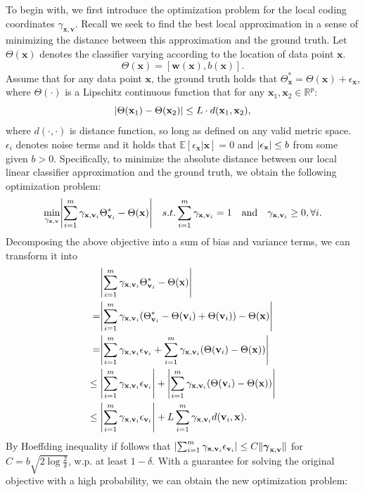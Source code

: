 \documentclass{llncs}
\DeclarePairedDelimiter\abs{\lvert}{\rvert}
\DeclarePairedDelimiter\norm{\lVert}{\rVert}
\def \x {\mathbf{x}}
\def \w {\mathbf{w}}
\def \v {\mathbf{v}}
\begin{document}
	To begin with, we first introduce the optimization problem for the local coding coordinates $\gamma_{\x,\v}$. Recall we seek to find the best local approximation in a sense of minimizing the distance between this approximation and the ground truth. Let $\Theta(\x)$ denotes the classifier varying according to the location of data point $\x$.
	\begin{equation}
	\Theta(\x) = [\w(\x), b(\x)].
	\end{equation}
	Assume that for any data point $\x$, the ground truth holds that $\Theta_{\x}^* = \Theta(\x) + \epsilon_{\x}$, where $\Theta(\cdot)$ is a Lipschitz continuous function that for any $\x_1, \x_2 \in \mathbb{R}^p$:
	\begin{equation}
	\abs{\Theta(\x_1)-\Theta(\x_2)} \leq L \cdot d(\x_1,\x_2),
	\end{equation}
	where $d(\cdot,\cdot)$ is distance function, so long as defined on any valid metric space. $\epsilon_i$ denotes noise terms and it holds that $\mathbb{E}[\epsilon_{\x}|\x]=0$ and $\abs{\epsilon_{\x}} \leq b$ from some given $b > 0$. Specifically, to minimize the absolute distance between our local linear classifier approximation and the ground truth, we obtain the following optimization problem:
	\begin{equation}
	\min_{\gamma_{\x,\v}} \abs*{\sum_{i=1}^m\gamma_{\x,\v_i}\Theta_{\v_i}^*- \Theta(\x)} \quad s.t. \sum_{i=1}^m\gamma_{\x,\v_i}=1 \quad \mbox{and} \quad \gamma_{\x,\v_i} \geq 0, \forall i.
	\end{equation} 
	Decomposing the above objective into a sum of bias and variance terms, we can transform it into
	\begin{equation}
	\begin{split}
	&\abs*{\sum_{i=1}^m\gamma_{\x,\v_i}\Theta_{\v_i}^*- \Theta(\x)} \\ {}=&\abs*{\sum_{i=1}^{m}\gamma_{\x,\v_i}(\Theta_{\v_i}^*-\Theta(\v_i)+\Theta(\v_i))-\Theta(\x)} \\
	{}=&\abs*{\sum_{i=1}^m\gamma_{\x,\v_i}\epsilon_{\v_i} + \sum_{i=1}^m\gamma_{\x,\v_i}(\Theta(\v_i)-\Theta(\x))}\\
	\leq{}& \abs*{\sum_{i=1}^m\gamma_{\x,\v_i}\epsilon_{\v_i}} + \abs*{\sum_{i=1}^m\gamma_{\x,\v_i}(\Theta(\v_i)-\Theta(\x))}\\
	\leq{}& \abs*{\sum_{i=1}^m\gamma_{\x,\v_i}\epsilon_{\v_i}} +
	L\sum_{i=1}^{m}\gamma_{\x,\v_i} d(\v_i,\x).
	\end{split}
	\end{equation}
	By Hoeffding inequality if follows that $\abs*{\sum_{i=1}^m\gamma_{\x,\v_i}\epsilon_{\v_i}} \leq C\norm{\boldsymbol{\gamma}_{\x,\v}}$ for $C=b\sqrt{2\log{\frac{2}{\delta}}}$, w.p. at least $1-\delta$. With a guarantee for solving the original objective with a high probability, we can obtain the new optimization problem:
\end{document}
